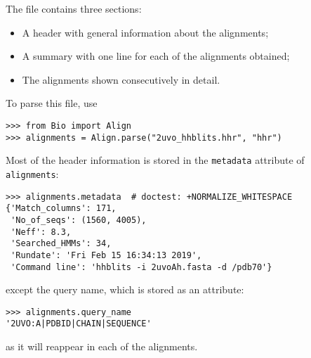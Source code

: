 The file contains three sections:
\begin{itemize}
\item A header with general information about the alignments;
\item A summary with one line for each of the alignments obtained;
\item The alignments shown consecutively in detail.
\end{itemize}

To parse this file, use
\begin{verbatim}
>>> from Bio import Align
>>> alignments = Align.parse("2uvo_hhblits.hhr", "hhr")
\end{verbatim}
Most of the header information is stored in the \verb|metadata| attribute of \verb|alignments|:
\begin{verbatim}
>>> alignments.metadata  # doctest: +NORMALIZE_WHITESPACE
{'Match_columns': 171,
 'No_of_seqs': (1560, 4005),
 'Neff': 8.3,
 'Searched_HMMs': 34,
 'Rundate': 'Fri Feb 15 16:34:13 2019',
 'Command line': 'hhblits -i 2uvoAh.fasta -d /pdb70'}
\end{verbatim}
except the query name, which is stored as an attribute:
\begin{verbatim}
>>> alignments.query_name
'2UVO:A|PDBID|CHAIN|SEQUENCE'
\end{verbatim}
as it will reappear in each of the alignments.

